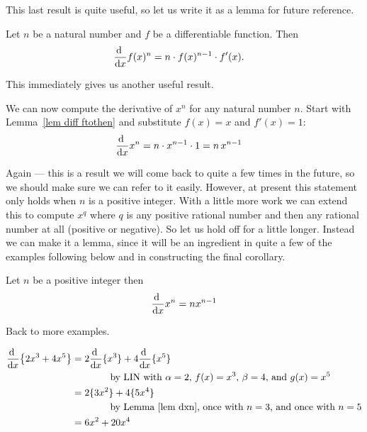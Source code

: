 This last result is quite useful, so let us write it as a lemma for future reference.
\begin{lemma}\label{lem diff ftothen}
Let $n$ be a natural number and $f$ be a differentiable function. Then
\begin{align*}
\diff{}{x} f(x)^n &= n\cdot  f(x)^{n-1} \cdot  f'(x).
\end{align*}
\end{lemma}

This immediately gives us another useful result.
\begin{eg}\label{eg:DIFFsimpleToolsC}
We can now compute the derivative of $x^n$ for any natural number $n$. Start with
Lemma~\ref{lem diff ftothen} and substitute $f(x)=x$ and $f'(x)=1$:
\begin{align*}
\diff{}{x}x^n &= n \cdot  x^{n-1} \cdot  1 = n\, x^{n-1}
\end{align*}
\end{eg}

Again --- this is a result we will come back to quite a few times in the future, so we
should make sure we can refer to it easily.  However, at present this statement only
holds  when $n$ is a positive integer. With a little more work we can extend this to
compute $x^q$ where $q$ is any positive rational number and then any rational number at
all (positive or negative). So let us hold off for a little
longer. Instead we can make it a lemma, since it will be an ingredient in quite
a few of the examples following below and in constructing the final corollary.
\begin{lemma}[Derivative of $x^n$]
\label{lem dxn}
  Let $n$ be a positive integer then
\begin{equation}\label{eq:DIFFderivXn}
\diff{}{x} x^n = n x^{n-1}
\end{equation}
\end{lemma}

Back to more examples.
\begin{eg}\label{eg:DIFFsimpleToolsD}
\begin{align*}
\diff{}{x}\big\{2x^3+4x^5\big\}
&=2\diff{}{x}\{x^3\}+4\diff{}{x}\{x^5\} \\
   &\qquad\qquad\text{by \lin\ with $\alpha=2$, $f(x)=x^3$, $\beta=4$, and $g(x)=x^5$} \\
&=2\{3x^2\}+4\{5x^4\} \\
   &\qquad\qquad\text{by  Lemma~\ref{lem dxn}, once with $n=3$, and
    once with $n=5$} \\
&=6x^2+20x^4
\end{align*}
\end{eg}


